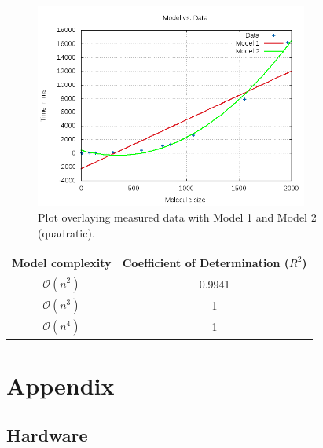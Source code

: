 \documentclass[a4paper,12pt]{article}
\begin{document}
\begin{figure}[!h]
  \centering
    \includegraphics[width=0.8\textwidth]{images/solver-perf-model.png}
  \caption{Plot overlaying measured data with Model 1 and Model 2 (quadratic).}
\end{figure}

\begin{center}
  \begin{tabular}{ | c | c | }
    \hline
    \textbf{Model complexity} & \textbf{Coefficient of Determination ($R^2$)} \\ \hline
    \hline
        $\mathcal{O}(n^2)$ & 0.9941 \\ \hline
        $\mathcal{O}(n^3)$ & 1 \\ \hline
        $\mathcal{O}(n^4)$ & 1 \\ \hline
  \end{tabular}
\end{center}

\pagebreak

\section{Appendix}

\subsection{Hardware}
\end{document}
